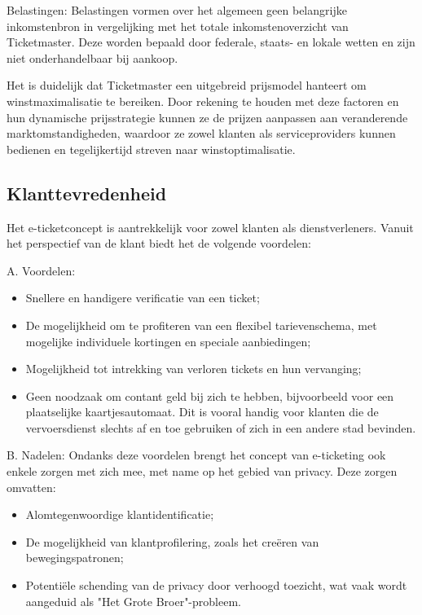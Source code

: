 Belastingen: Belastingen vormen over het algemeen geen belangrijke inkomstenbron in vergelijking met het totale inkomstenoverzicht van Ticketmaster. Deze worden bepaald door federale, staats- en lokale wetten en zijn niet onderhandelbaar bij aankoop.

\vspace{5 mm}

Het is duidelijk dat Ticketmaster een uitgebreid prijsmodel hanteert om winstmaximalisatie te bereiken. Door rekening te houden met deze factoren en hun dynamische prijsstrategie kunnen ze de prijzen aanpassen aan veranderende marktomstandigheden, waardoor ze zowel klanten als serviceproviders kunnen bedienen en tegelijkertijd streven naar winstoptimalisatie.

\newpage
\subsection{Klanttevredenheid}

Het e-ticketconcept is aantrekkelijk voor zowel klanten als dienstverleners. Vanuit het perspectief van de klant biedt het de volgende voordelen:
\vspace{5 mm}

A. Voordelen:
\begin{itemize}
    \item Snellere en handigere verificatie van een ticket;
    \item De mogelijkheid om te profiteren van een flexibel tarievenschema, met mogelijke individuele kortingen en speciale aanbiedingen;
    \item Mogelijkheid tot intrekking van verloren tickets en hun vervanging;
    \item Geen noodzaak om contant geld bij zich te hebben, bijvoorbeeld voor een plaatselijke kaartjesautomaat. Dit is vooral handig voor klanten die de vervoersdienst slechts af en toe gebruiken of zich in een andere stad bevinden.
\end{itemize}
\vspace{5 mm}

B. Nadelen:
Ondanks deze voordelen brengt het concept van e-ticketing ook enkele zorgen met zich mee, met name op het gebied van privacy. Deze zorgen omvatten:
\begin{itemize}
    \item Alomtegenwoordige klantidentificatie;
    \item De mogelijkheid van klantprofilering, zoals het creëren van bewegingspatronen;
    \item Potentiële schending van de privacy door verhoogd toezicht, wat vaak wordt aangeduid als "Het Grote Broer"-probleem.
\end{itemize}


